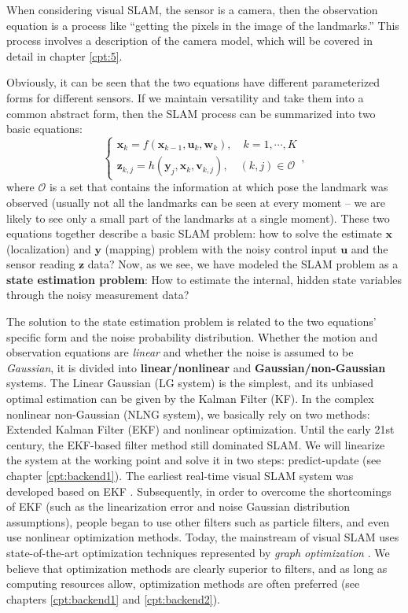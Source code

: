 When considering visual SLAM, the sensor is a camera, then the observation equation is a process like ``getting the pixels in the image of the landmarks.'' This process involves a description of the camera model, which will be covered in detail in chapter \ref{cpt:5}.

Obviously, it can be seen that the two equations have different parameterized forms for different sensors. If we maintain versatility and take them into a common abstract form, then the SLAM process can be summarized into two basic equations:
\begin{equation}
\label{eq:slamproblem}
\left\{ \begin{array}{l}
{\mathbf{x}_k} = f\left( {{\mathbf{x}_{k - 1}},{\mathbf{u}_k}}, \mathbf{w}_k \right),\quad k=1,\cdots, K\\
{\mathbf{z}_{k,j}} = h\left( {{ \mathbf{y}_j},{ \mathbf{x}_k}}, \mathbf{v}_{k,j} \right), \quad (k,j) \in \mathcal{O}
\end{array} \right. ,
\end{equation}
where $\mathcal{O}$ is a set that contains the information at which pose the landmark was observed (usually not all the landmarks can be seen at every moment – ​​we are likely to see only a small part of the landmarks  at a single moment). These two equations together describe a basic SLAM problem: how to solve the estimate $\mathbf{x}$ (localization) and $\mathbf{y}$ (mapping) problem with the noisy control input $\mathbf{u}$ and the sensor reading $\mathbf{z}$ data? Now, as we see, we have modeled the SLAM problem as a \textbf{state estimation problem}: How to estimate the internal, hidden state variables through the noisy measurement data?

The solution to the state estimation problem is related to the two equations' specific form and the noise probability distribution. Whether the motion and observation equations are \textit{linear} and whether the noise is assumed to be \textit{Gaussian}, it is divided into \textbf{linear/nonlinear} and \textbf{Gaussian/non-Gaussian} systems. The Linear Gaussian (LG system) is the simplest, and its unbiased optimal estimation can be given by the Kalman Filter (KF). In the complex nonlinear non-Gaussian (NLNG system), we basically rely on two methods: Extended Kalman Filter (EKF) and nonlinear optimization. Until the early 21st century, the EKF-based filter method still dominated SLAM. We will linearize the system at the working point and solve it in two steps: predict-update (see chapter \ref{cpt:backend1}). The earliest real-time visual SLAM system was developed based on EKF {\cite{Davison2007}}. Subsequently, in order to overcome the shortcomings of EKF (such as the linearization error and noise Gaussian distribution assumptions), people began to use other filters such as particle filters, and even use nonlinear optimization methods. Today, the mainstream of visual SLAM uses state-of-the-art optimization techniques represented by \textit{graph optimization} {\cite{Strasdat2012}}. We believe that optimization methods are clearly superior to filters, and as long as computing resources allow, optimization methods are often preferred (see chapters \ref{cpt:backend1} and \ref{cpt:backend2}).

